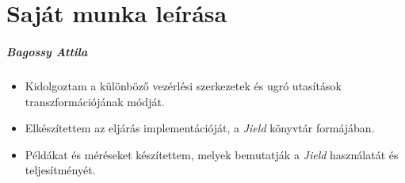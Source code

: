 \chapter*{Saját munka leírása}

\paragraph{Bagossy Attila}

\begin{itemize}
    \item Kidolgoztam a különböző vezérlési szerkezetek és ugró utasítások transzformációjának módját.
    \item Elkészítettem az eljárás implementációját, a \textit{Jield} könyvtár formájában.
    \item Példákat és méréseket készítettem, melyek bemutatják a \textit{Jield} használatát és teljesítményét.
\end{itemize}